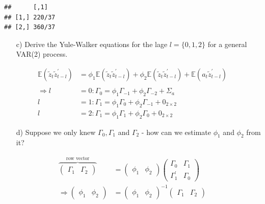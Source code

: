 \documentclass[12pt,a4paper]{article}
\begin{document}
\begin{verbatim}
##      [,1]  
## [1,] 220/37
## [2,] 360/37
\end{verbatim}

\begin{itemize}
    \item[c)] Derive the Yule-Walker equations for the lage $l = \{0,1,2 \}$ for a general VAR(2) process.
\end{itemize}

\begin{align*}
  \mathbb{E} \left( \tilde{z}_{t} \tilde{z}_{t-l}^{'} \right) & =  \phi_1 \mathbb{E} \left( \tilde{z}_{t} \tilde{z}_{t-l}^{'} \right) + \phi_2 \mathbb{E} \left( \tilde{z}_{t} \tilde{z}_{t-l}^{'} \right) + \mathbb{E} \left( a_{t} \tilde{z}_{t-l}^{'} \right)\\
  \\
  \Rightarrow l & = 0: \Gamma_0 = \phi_1 \Gamma_{-1} + \phi_2 \Gamma_{-2} + \Sigma_a \\
  l & = 1: \Gamma_1 = \phi_1 \Gamma_{0} + \phi_2 \Gamma_{-1} + 0_{2 \times 2}\\
  l & = 2: \Gamma_1 = \phi_1 \Gamma_{1} + \phi_2 \Gamma_{0} + 0_{2 \times 2}
\end{align*}

\begin{itemize}
    \item[d)] Suppose we only knew $\Gamma_0 , \Gamma_1$ and $\Gamma_2$ - how can we estimate $\phi_1$ and $\phi_2$ from it?
\end{itemize}

\begin{align*}
  \overbrace{\begin{pmatrix} \Gamma_1 & \Gamma_2 \end{pmatrix}}^{\text{row vector}} & = \begin{pmatrix} \phi_1 & \phi_2 \end{pmatrix} \begin{pmatrix} \Gamma_0 & \Gamma_1\\
  \Gamma_1^{'} & \Gamma_0 \end{pmatrix}\\
  \Rightarrow \begin{pmatrix} \phi_1 & \phi_2 \end{pmatrix} & = \begin{pmatrix} \phi_1 & \phi_2 \end{pmatrix}^{-1} \begin{pmatrix} \Gamma_1 & \Gamma_2 \end{pmatrix} 
\end{align*}
\end{document}
